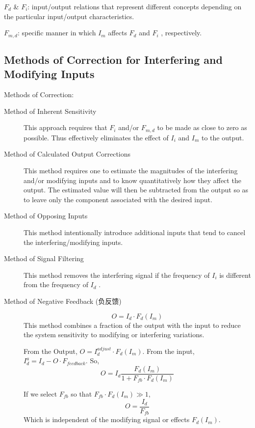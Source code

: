 \documentclass[a4paper,UTF8]{article}
\theoremstyle{mystyle}{
  \newtheorem{law}{Law}
}
\begin{document}
$F_d$ \& $F_i$: input/output relations that represent different
concepts depending on the particular input/output
characteristics.

$F_{m,d}$: specific manner in which $I_ m$
affects $F_d$ and $F _i$ , respectively. 
\subsection{Methods of Correction for Interfering and Modifying Inputs}
Methods of Correction:
\begin{description}
\item[Method of Inherent Sensitivity] 
This approach requires that $F_i$ and/or $F_{m,d}$ to be made as
close to zero as possible. Thus effectively eliminates the
effect of $I_i$ and $I_m$ to the output.
\item[Method of Calculated Output Corrections]
This method requires one to estimate the magnitudes of the
interfering and/or modifying inputs and to know
quantitatively how they affect the output. The estimated
value will then be subtracted from the output so as to leave
only the component associated with the desired input.

\item[Method of Opposing Inputs]
This method intentionally introduce additional inputs that
tend to cancel the interfering/modifying inputs.

\item[Method of Signal Filtering]
This method removes the interfering signal if the frequency
of $I_i$ is different from the frequency of $I_d$ .

\item[Method of Negative Feedback (负反馈)]
\[
O=I_d \cdot F_d(I_m)
\]
This method combines a fraction of the output with the
input to reduce the system sensitivity to modifying or
interfering variations.

From the Output, $O=I_d^{adjust}\cdot F_d(I_m)$.
From the input, $I_d^a=I_d-O\cdot F_{feedback}$.
So, 
\[
O=I_d\frac{F_d(I_m)}{1+F_{fb}\cdot F_d(I_m)}
\]

If we select $F_{fb}$ so that $F_{fb}\cdot F_d(I_m) \gg 1$,
\[
O=\frac{I_d}{F_{fb}}
\]
Which is independent of the modifying signal or effects $F_d(I_m)$.

\end{description}
\end{document}
